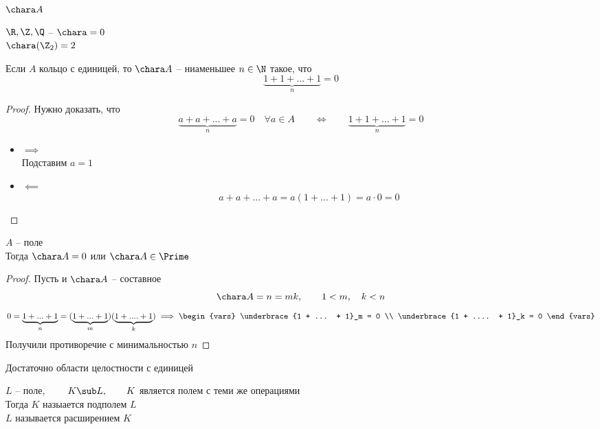 \begin{definition}
	$ \chara A $
\end{definition}

\begin{egs}
	$ \R, \Z, \Q $ -- $ \chara = 0 $ \\
	$ \chara (\Z_2) = 2 $
\end{egs}

\begin{property}
	Если $ A $ кольцо с единицей, то $ \chara A $ -- ниаменьшее $ n \in \N $ такое, что
	$$ \underbrace{1 + 1 + ... + 1}_n = 0 $$
\end{property}

\begin{proof}
	Нужно доказать, что
	$$ \underbrace{a + a + ... + a}_n = 0 \quad \forall a \in A \qquad \iff \qquad \underbrace{1 + 1 + ... + 1}_n = 0 $$
	\begin{itemize}
		\item $ \implies $ \\
		Подставим $ a = 1 $
		\item $ \impliedby $
		$$ a + a + ... + a = a(1 + ... + 1) = a \cdot 0 = 0 $$
	\end{itemize}
\end{proof}

\begin{property}
	$ A $ -- поле \\
	Тогда $ \chara A = 0 $ или $ \chara A \in \Prime $
\end{property}

\begin{proof}
	Пусть  и $ \chara A $ -- составное
	$$ \chara A = n = mk, \qquad 1 < m, \quad k < n $$
	$$ 0 = \underbrace{1 + ... + 1}_n = (\underbrace{1 + ... + 1}_m)(\underbrace{1 + .... + 1}_k) \implies
	\begin{vars}
		\underbrace{1 + ... + 1}_m = 0 \\
		\underbrace{1 + .... + 1}_k = 0
	\end{vars} $$
	Получили противоречие с минимальностью $ n $
\end{proof}

\begin{note}
	Достаточно области целостности с единицей
\end{note}

\begin{definition}
	$ L $ -- поле, $ \qquad K \sub L, \qquad K $ является полем с теми же операциями \\
	Тогда $ K $ назыается подполем $ L $ \\
	$ L $ называется расширением $ K $
\end{definition}

